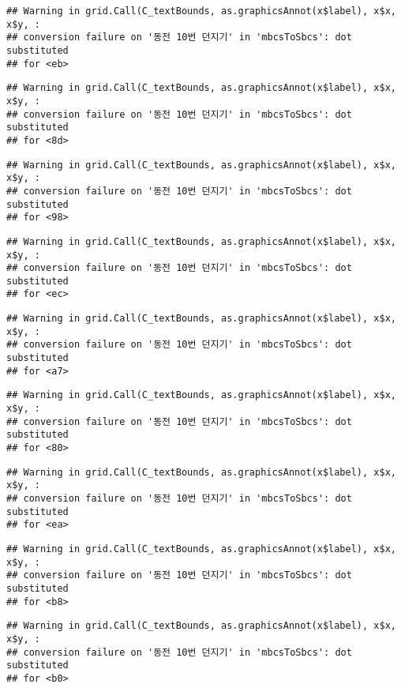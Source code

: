 \documentclass[]{book}
\begin{document}
\begin{verbatim}
## Warning in grid.Call(C_textBounds, as.graphicsAnnot(x$label), x$x, x$y, :
## conversion failure on '동전 10번 던지기' in 'mbcsToSbcs': dot substituted
## for <eb>
\end{verbatim}

\begin{verbatim}
## Warning in grid.Call(C_textBounds, as.graphicsAnnot(x$label), x$x, x$y, :
## conversion failure on '동전 10번 던지기' in 'mbcsToSbcs': dot substituted
## for <8d>
\end{verbatim}

\begin{verbatim}
## Warning in grid.Call(C_textBounds, as.graphicsAnnot(x$label), x$x, x$y, :
## conversion failure on '동전 10번 던지기' in 'mbcsToSbcs': dot substituted
## for <98>
\end{verbatim}

\begin{verbatim}
## Warning in grid.Call(C_textBounds, as.graphicsAnnot(x$label), x$x, x$y, :
## conversion failure on '동전 10번 던지기' in 'mbcsToSbcs': dot substituted
## for <ec>
\end{verbatim}

\begin{verbatim}
## Warning in grid.Call(C_textBounds, as.graphicsAnnot(x$label), x$x, x$y, :
## conversion failure on '동전 10번 던지기' in 'mbcsToSbcs': dot substituted
## for <a7>
\end{verbatim}

\begin{verbatim}
## Warning in grid.Call(C_textBounds, as.graphicsAnnot(x$label), x$x, x$y, :
## conversion failure on '동전 10번 던지기' in 'mbcsToSbcs': dot substituted
## for <80>
\end{verbatim}

\begin{verbatim}
## Warning in grid.Call(C_textBounds, as.graphicsAnnot(x$label), x$x, x$y, :
## conversion failure on '동전 10번 던지기' in 'mbcsToSbcs': dot substituted
## for <ea>
\end{verbatim}

\begin{verbatim}
## Warning in grid.Call(C_textBounds, as.graphicsAnnot(x$label), x$x, x$y, :
## conversion failure on '동전 10번 던지기' in 'mbcsToSbcs': dot substituted
## for <b8>
\end{verbatim}

\begin{verbatim}
## Warning in grid.Call(C_textBounds, as.graphicsAnnot(x$label), x$x, x$y, :
## conversion failure on '동전 10번 던지기' in 'mbcsToSbcs': dot substituted
## for <b0>
\end{verbatim}
\end{document}
